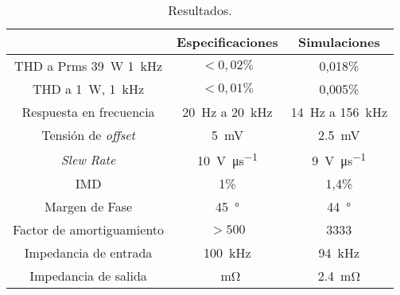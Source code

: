 \begin{table}[H]
	\centering
	\begin{tabular}{ccc}
		\toprule
		& Especificaciones & Simulaciones \\
		\midrule
		 THD a Prms \SI{39}{\watt} \SI{1}{\kilo\hertz}& $< 0,02\%$ &  0,018\% \\
		 THD a \SI{1}{\watt}, \SI{1}{\kilo\hertz} & $< 0,01\%$ & 0,005\% \\
		 Respuesta en frecuencia & \SI{20}{\hertz} a \SI{20}{\kilo\hertz} & \SI{14}{\hertz} a \SI{156}{\kilo\hertz} \\
		 Tensión de \textit{offset} & \SI{5}{\milli\volt} & \SI{2.5}{\milli\volt} \\
		 \textit{Slew Rate} & \SI{10}{\volt\per\micro\second} &  \SI{9}{\volt\per\micro\second} \\
		 IMD & 1\% & 1,4\% \\
		 Margen de Fase & \SI{45}{\degree} &  \SI{44}{\degree} \\
		 Factor de amortiguamiento & $>500$ & 3333 \\
		 Impedancia de entrada & \SI{100}{\kilo\hertz} & \SI{94}{\kilo\hertz} \\
		 Impedancia de salida & \SI{}{\milli\ohm} & \SI{2.4}{\milli\ohm}\\
		\bottomrule
	\end{tabular}
	\caption{Resultados.}
	\label{tab.resultados}
\end{table}
